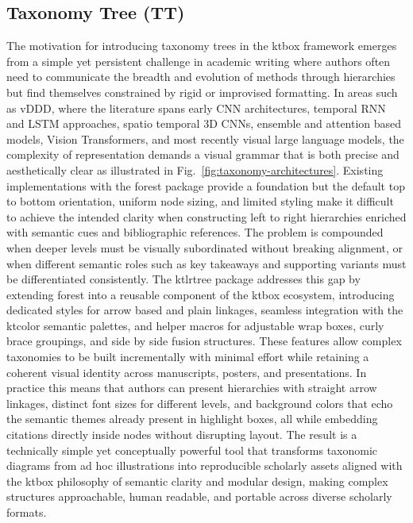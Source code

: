 \documentclass[12pt,onecolumn]{article}
\begin{document}
\subsection{Taxonomy Tree (TT)}
\label{sec:taxonomy-tree}
  The motivation for introducing taxonomy trees in the ktbox framework emerges from a simple yet persistent challenge in academic writing where authors often need to communicate the breadth and evolution of methods through hierarchies but find themselves constrained by rigid or improvised formatting. In areas such as vDDD, where the literature spans early CNN architectures, temporal RNN and LSTM approaches, spatio temporal 3D CNNs, ensemble and attention based models, Vision Transformers, and most recently visual large language models, the complexity of representation demands a visual grammar that is both precise and aesthetically clear as illustrated in Fig.~\ref{fig:taxonomy-architectures}. Existing implementations with the forest package provide a foundation but the default top to bottom orientation, uniform node sizing, and limited styling make it difficult to achieve the intended clarity when constructing left to right hierarchies enriched with semantic cues and bibliographic references. The problem is compounded when deeper levels must be visually subordinated without breaking alignment, or when different semantic roles such as key takeaways and supporting variants must be differentiated consistently. The ktlrtree package addresses this gap by extending forest into a reusable component of the ktbox ecosystem, introducing dedicated styles for arrow based and plain linkages, seamless integration with the ktcolor semantic palettes, and helper macros for adjustable wrap boxes, curly brace groupings, and side by side fusion structures. These features allow complex taxonomies to be built incrementally with minimal effort while retaining a coherent visual identity across manuscripts, posters, and presentations. In practice this means that authors can present hierarchies with straight arrow linkages, distinct font sizes for different levels, and background colors that echo the semantic themes already present in highlight boxes, all while embedding citations directly inside nodes without disrupting layout. The result is a technically simple yet conceptually powerful tool that transforms taxonomic diagrams from ad hoc illustrations into reproducible scholarly assets aligned with the ktbox philosophy of semantic clarity and modular design, making complex structures approachable, human readable, and portable across diverse scholarly formats.
\end{document}
